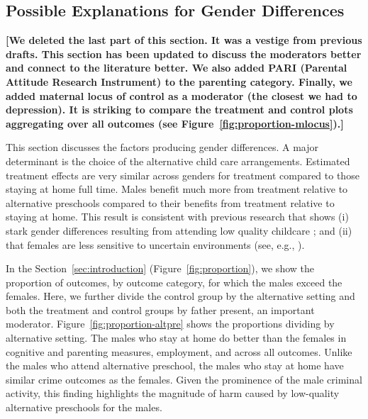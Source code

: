 \subsection{Possible Explanations for Gender Differences}

\textbf{[We deleted the last part of this section. It was a vestige from previous drafts. This section has been updated to discuss the moderators better and connect to the literature better. We also added PARI (Parental Attitude Research Instrument) to the parenting category. Finally, we added maternal locus of control as a moderator (the closest we had to depression). It is striking to compare the treatment and control plots aggregating over all outcomes (see Figure~\ref{fig:proportion-mlocus}).]}

This section discusses the factors producing gender differences. A major determinant is the choice of the alternative child care arrangements. 
Estimated treatment effects are very similar across genders for treatment compared to those staying at home full time. Males benefit much more from treatment relative to alternative preschools compared to their benefits from treatment relative to staying at home. This result is consistent with previous research that shows (i) stark gender differences resulting from attending low quality childcare \citep{Kottelenberg-Lehrer_2014_Gender-Effects,Baker_Gruber_Milligan_2015_Noncog_Defects}; and (ii) that females are less sensitive to uncertain environments (see, e.g., \citealp{Autor-etal_2015_Family-Disadvantage}).

In the Section~\ref{sec:introduction} (Figure~\ref{fig:proportion}), we show the proportion of outcomes, by outcome category, for which the males exceed the females. Here, we further divide the control group by the alternative setting and both the treatment and control groups by father present, an important moderator. Figure~\ref{fig:proportion-altpre} shows the proportions dividing by alternative setting. The males who stay at home do better than the females in cognitive and parenting measures, employment, and across all outcomes. Unlike the males who attend alternative preschool, the males who stay at home have similar crime outcomes as the females. Given the prominence of the male criminal activity, this finding highlights the magnitude of harm caused by low-quality alternative preschools for the males. 

